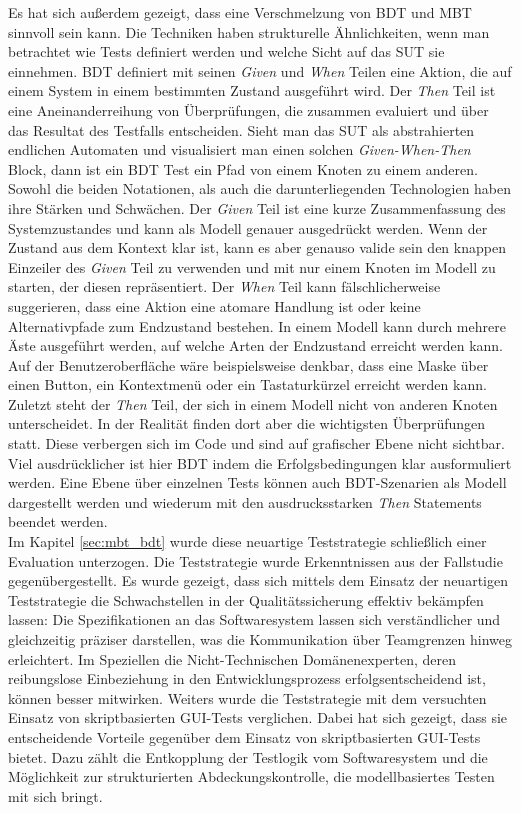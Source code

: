 Es hat sich außerdem gezeigt, dass eine Verschmelzung von \Gls{BDT} und \Gls{MBT} sinnvoll sein kann. Die Techniken haben strukturelle Ähnlichkeiten, wenn man betrachtet wie Tests definiert werden und welche Sicht auf das \Gls{SUT} sie einnehmen. \Gls{BDT} definiert mit seinen \textit{Given} und \textit{When} Teilen eine Aktion, die auf einem System in einem bestimmten Zustand ausgeführt wird. Der \textit{Then} Teil ist eine Aneinanderreihung von Überprüfungen, die zusammen evaluiert und über das Resultat des Testfalls entscheiden. Sieht man das \Gls{SUT} als abstrahierten endlichen Automaten und visualisiert man einen solchen \textit{Given-When-Then} Block, dann ist ein \Gls{BDT} Test ein Pfad von einem Knoten zu einem anderen. Sowohl die beiden Notationen, als auch die darunterliegenden Technologien haben ihre Stärken und Schwächen. Der \textit{Given} Teil ist eine kurze Zusammenfassung des Systemzustandes und kann als Modell genauer ausgedrückt werden. Wenn der Zustand aus dem Kontext klar ist, kann es aber genauso valide sein den knappen Einzeiler des \textit{Given} Teil zu verwenden und mit nur einem Knoten im Modell zu starten, der diesen repräsentiert. Der \textit{When} Teil kann fälschlicherweise suggerieren, dass eine Aktion eine atomare Handlung ist oder keine Alternativpfade zum Endzustand bestehen. In einem Modell kann durch mehrere Äste ausgeführt werden, auf welche Arten der Endzustand erreicht werden kann. Auf der Benutzeroberfläche wäre beispielsweise denkbar, dass eine Maske über einen Button, ein Kontextmenü oder ein Tastaturkürzel erreicht werden kann. Zuletzt steht der \textit{Then} Teil, der sich in einem Modell nicht von anderen Knoten unterscheidet. In der Realität finden dort aber die wichtigsten Überprüfungen statt. Diese verbergen sich im Code und sind auf grafischer Ebene nicht sichtbar. Viel ausdrücklicher ist hier \Gls{BDT} indem die Erfolgsbedingungen klar ausformuliert werden. Eine Ebene über einzelnen Tests können auch \Gls{BDT}-Szenarien als Modell dargestellt werden und wiederum mit den ausdrucksstarken \textit{Then} Statements beendet werden.\\

Im Kapitel \ref{sec:mbt_bdt} wurde diese neuartige Teststrategie schließlich einer Evaluation unterzogen. Die Teststrategie wurde Erkenntnissen aus der Fallstudie gegenübergestellt. Es wurde gezeigt, dass sich mittels dem Einsatz der neuartigen Teststrategie die Schwachstellen in der Qualitätssicherung effektiv bekämpfen lassen: Die Spezifikationen an das Softwaresystem lassen sich verständlicher und gleichzeitig präziser darstellen, was die Kommunikation über Teamgrenzen hinweg erleichtert. Im Speziellen die Nicht-Technischen Domänenexperten, deren reibungslose Einbeziehung in den Entwicklungsprozess erfolgsentscheidend ist, können besser mitwirken. Weiters wurde die Teststrategie mit dem versuchten Einsatz von skriptbasierten GUI-Tests verglichen. Dabei hat sich gezeigt, dass sie entscheidende Vorteile gegenüber dem Einsatz von skriptbasierten GUI-Tests bietet. Dazu zählt die Entkopplung der Testlogik vom Softwaresystem und die Möglichkeit zur strukturierten Abdeckungskontrolle, die modellbasiertes Testen mit sich bringt.\\

